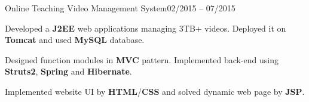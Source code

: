 \begin{rSubsection}{Online Teaching Video Management System}{02/2015 – 07/2015}{}{}
\item Developed a {\bf J2EE} web applications managing 3TB+ videos. Deployed it on {\bf Tomcat} and used {\bf MySQL} database.
\item Designed function modules in {\bf MVC} pattern. Implemented back-end using {\bf Struts2}, {\bf Spring} and {\bf Hibernate}.
\item Implemented website UI by {\bf HTML}/{\bf CSS} and solved dynamic web page by {\bf JSP}.
\end{rSubsection}